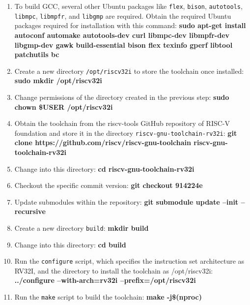 \begin{enumerate}
\item To build GCC, several other Ubuntu packages like \verb|flex|, \verb|bison|, \verb|autotools|, \verb|libmpc|, \verb|libmpfr|, and \verb|libgmp| are required. Obtain the required Ubuntu packages required for installation with this command:\newline
\small \textbf{sudo apt-get install autoconf automake autotools-dev curl libmpc-dev libmpfr-dev libgmp-dev gawk build-essential bison flex texinfo gperf libtool patchutils bc}

\item Create a new directory \verb|/opt/riscv32i| to store the toolchain once installed:
\newline
\small \textbf{sudo mkdir /opt/riscv32i}

\item Change permissions of the directory created in the previous step:\newline
\small \textbf{sudo chown \$USER /opt/riscv32i}

\item Obtain the toolchain from the riscv-tools GitHub repository of RISC-V foundation and store it in the directory \verb|riscv-gnu-toolchain-rv32i|:\newline
\small \textbf{git clone https://github.com/riscv/riscv-gnu-toolchain riscv-gnu-toolchain-rv32i}

\item Change into this directory:
\newline
\small \textbf{cd riscv-gnu-toolchain-rv32i}

\item Checkout the specific commit version:
\newline
\small \textbf{git checkout 914224e}

\item Update submodules within the repository:
\newline
\small \textbf{git submodule update --init --recursive}


\item Create a new directory \verb|build|:
\newline
\small \textbf{mkdir build}

\item Change into this directory:
\newline
\small \textbf{cd build}

\item Run the \verb|configure| script, which specifies the instruction set architecture as RV32I, and the directory to install the toolchain as /opt/riscv32i:
\newline
\small \textbf{../configure --with-arch=rv32i --prefix=/opt/riscv32i}

\item Run the \verb|make| script to build the toolchain:
\newline
\small \textbf{make -j\$(nproc)}
\end{enumerate}


